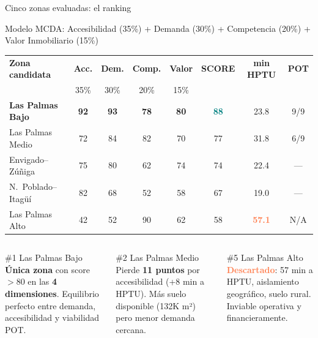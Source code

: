 \documentclass[aspectratio=169, 11pt]{beamer}
\newcommand{\highlight}[1]{\textcolor{teal}{\textbf{#1}}}
\newcommand{\danger}[1]{\textcolor{coral}{\textbf{#1}}}
\begin{document}
\begin{frame}{Cinco zonas evaluadas: el ranking}

\begin{center}
{\small Modelo MCDA: Accesibilidad (35\%) + Demanda (30\%) + Competencia (20\%) + Valor Inmobiliario (15\%)}
\end{center}

\vspace{6pt}
\begin{center}
{\small
\begin{tabular}{@{}lccccccc@{}}
\toprule
\textbf{Zona candidata} & \textbf{Acc.} & \textbf{Dem.} & \textbf{Comp.} & \textbf{Valor} & \textbf{SCORE} & \textbf{min HPTU} & \textbf{POT} \\
 & {\tiny 35\%} & {\tiny 30\%} & {\tiny 20\%} & {\tiny 15\%} & & & \\
\midrule
\rowcolor{teal!12}
\textbf{Las Palmas Bajo} & \textbf{92} & \textbf{93} & \textbf{78} & \textbf{80} & \highlight{88} & 23.8 & 9/9 \\
Las Palmas Medio & 72 & 84 & 82 & 70 & 77 & 31.8 & 6/9 \\
Envigado--Zúñiga & 75 & 80 & 62 & 74 & 74 & 22.4 & --- \\
N.\ Poblado--Itagüí & 82 & 68 & 52 & 58 & 67 & 19.0 & --- \\
\rowcolor{coral!6}
Las Palmas Alto & 42 & 52 & 90 & 62 & 58 & \danger{57.1} & N/A \\
\bottomrule
\end{tabular}
}
\end{center}

\vspace{8pt}
\begin{columns}[T]
\begin{exampleblock}{\small \#1 Las Palmas Bajo}
\footnotesize \textbf{Única zona} con score $>$80 en las \textbf{4 dimensiones}. Equilibrio perfecto entre demanda, accesibilidad y viabilidad POT.
\end{exampleblock}

\begin{block}{\small \#2 Las Palmas Medio}
\footnotesize Pierde \textbf{11 puntos} por accesibilidad (+8 min a HPTU). Más suelo disponible (132K m²) pero menor demanda cercana.
\end{block}

\begin{alertblock}{\small \#5 Las Palmas Alto}
\footnotesize \danger{Descartado}: 57 min a HPTU, aislamiento geográfico, suelo rural. Inviable operativa y financieramente.
\end{alertblock}
\end{columns}
\end{frame}
\end{document}
